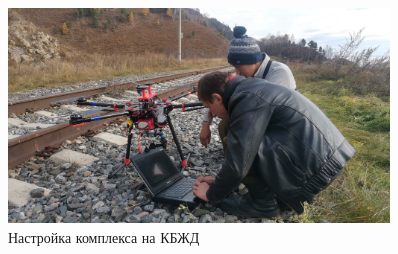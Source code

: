 \begin{figure}[h!]
  \begin{center}
    \includegraphics[width=0.9\textwidth]{authors/efremov-fig2.jpg}
  \end{center}
  \vspace{-0.5cm}
  \caption{Настройка комплекса на КБЖД}
  \label{fig:efremov-fig2}
\end{figure}
